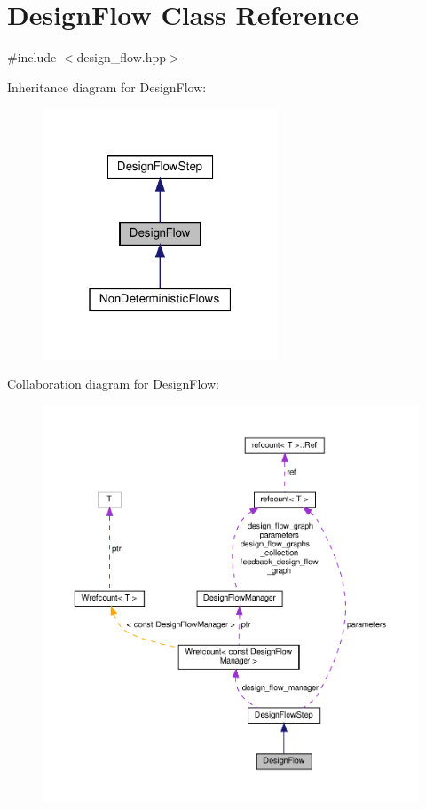 \hypertarget{classDesignFlow}{}\section{Design\+Flow Class Reference}
\label{classDesignFlow}


{\ttfamily \#include $<$design\+\_\+flow.\+hpp$>$}



Inheritance diagram for Design\+Flow\+:
\nopagebreak
\begin{figure}[H]
\begin{center}
\leavevmode
\includegraphics[width=199pt]{d6/def/classDesignFlow__inherit__graph}
\end{center}
\end{figure}


Collaboration diagram for Design\+Flow\+:
\nopagebreak
\begin{figure}[H]
\begin{center}
\leavevmode
\includegraphics[width=350pt]{d2/d00/classDesignFlow__coll__graph}
\end{center}
\end{figure}
